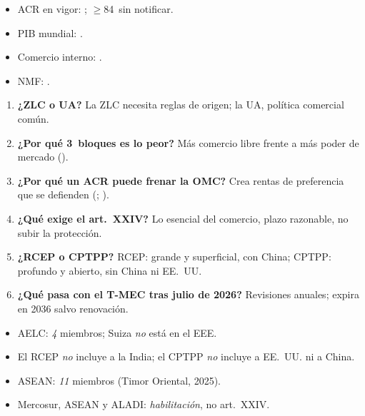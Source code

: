 \documentclass{article}
\begin{document}
\begin{columnas}
\anexorepaso
{}
\begin{itemize}
\item ACR en vigor: ; $\geq$84~sin notificar.
\item PIB mundial: .
\item Comercio interno: .
\item NMF: .
\end{itemize}
\begin{enumerate}
\item \textbf{¿ZLC o UA?} La ZLC necesita reglas de origen; la UA, política comercial común.
\item \textbf{¿Por qué 3~bloques es lo peor?} Más comercio libre frente a más poder de mercado ().
\item \textbf{¿Por qué un ACR puede frenar la OMC?} Crea rentas de preferencia que se defienden (; ).
\item \textbf{¿Qué exige el art.~XXIV?} Lo esencial del comercio, plazo razonable, no subir la protección.
\item \textbf{¿RCEP o CPTPP?} RCEP: grande y superficial, con China; CPTPP: profundo y abierto, sin China ni EE.~UU.
\item \textbf{¿Qué pasa con el T-MEC tras julio de 2026?} Revisiones anuales; expira en 2036 salvo renovación.
\end{enumerate}
\begin{trampa}
\begin{itemize}
\item AELC: \emph{4} miembros; Suiza \emph{no} está en el EEE.
\item El RCEP \emph{no} incluye a la India; el CPTPP \emph{no} incluye a EE.~UU. ni a China.
\item ASEAN: \emph{11} miembros (Timor Oriental, 2025).
\item Mercosur, ASEAN y ALADI: \emph{habilitación}, no art.~XXIV.
\end{itemize}
\end{trampa}

\end{columnas}
\end{document}
